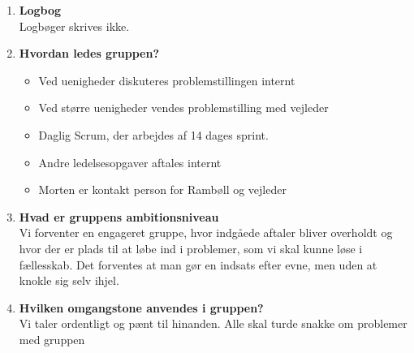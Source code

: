 \begin{enumerate}
		\item \textbf{Logbog}\\
			Logbøger skrives ikke.
			\vspace{1cm}
		\item \textbf{Hvordan ledes gruppen?}
			\begin{itemize}[-]
				\itemsep 0.3em
					\item Ved uenigheder diskuteres problemstillingen internt
					\item Ved større uenigheder vendes problemstilling med vejleder
				\item Daglig Scrum, der arbejdes af 14 dages sprint.
				\item Andre ledelsesopgaver aftales internt
				\item Morten er kontakt person for Rambøll og vejleder
				\vspace{1cm}
			\end{itemize}
		
		\item \textbf{Hvad er gruppens ambitionsniveau} \\
				Vi forventer en engageret gruppe, hvor indgåede aftaler bliver overholdt og hvor der er plads til at løbe ind i problemer, som vi skal kunne løse i fællesskab.
				Det forventes at man gør en indsats efter evne, men uden at knokle sig selv ihjel.
				\vspace{1cm}
		
		\item \textbf{Hvilken omgangstone anvendes i gruppen?}\\
				Vi taler ordentligt og pænt til hinanden. Alle skal turde snakke om problemer med gruppen
				\vspace{1cm}
			
	\end{enumerate}
	

